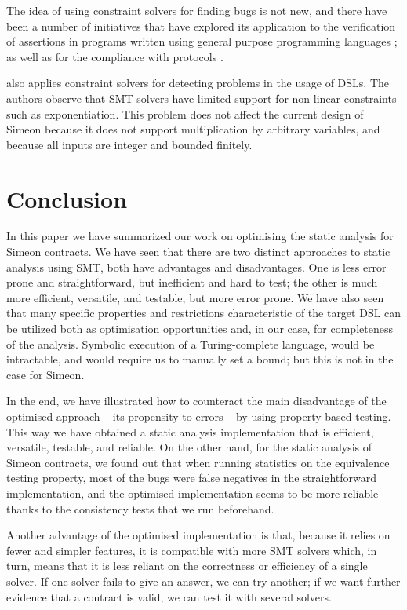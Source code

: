\documentclass[english,runningheads]{llncs}
\begin{document}
The idea of using constraint solvers for finding bugs is not new,
and there have been a number of initiatives that have explored its
application to the verification of assertions in programs written
using general purpose programming languages \cite{gulwani2008program,jackson2000finding};
as well as for the compliance with protocols
\cite{ball2001automatically,xie2005saturn}.

\cite{keshishzadeh2013early} also applies constraint solvers for
detecting problems in the usage of DSLs. The authors observe that
SMT solvers have limited support for non-linear constraints such as
exponentiation. This problem does not affect the current design of
Simeon because it does not support multiplication by arbitrary variables,
and because all inputs are integer and bounded finitely.




\section{Conclusion}

In this paper we have summarized our work
on optimising the static analysis for Simeon contracts. We have seen
that there are two distinct approaches to static analysis using SMT,
both have advantages and disadvantages. One is less error prone and
straightforward, but inefficient and hard to test; the other 
is much more efficient, versatile, and testable, but more error prone.
We have also seen that many specific properties and restrictions characteristic
of the target DSL can be utilized both as optimisation opportunities
and, in our case, for completeness of the analysis. Symbolic execution
of a Turing-complete language, would be intractable,
and would require us to manually set a bound; but this is not in the
case for Simeon.

In the end, we have illustrated how to counteract the main disadvantage
of the optimised approach -- its propensity to errors -- by using property
based testing. This way we have obtained a static analysis implementation
that is efficient, versatile, testable, and reliable. 
On the other hand, for the static analysis of Simeon contracts, we
found out that when running statistics on the equivalence testing
property, most of the bugs were false negatives in the straightforward
implementation, and the optimised implementation seems to be more
reliable thanks to the consistency tests that we run beforehand.

Another advantage of the optimised implementation is that, because
it relies on fewer and simpler features, it is compatible with more
SMT solvers which, in turn, means that it is less reliant on the
correctness or efficiency of a single solver. If one solver fails to give
an answer, we can try another; if we want further evidence that a
contract is valid, we can test it with several solvers.
\end{document}
